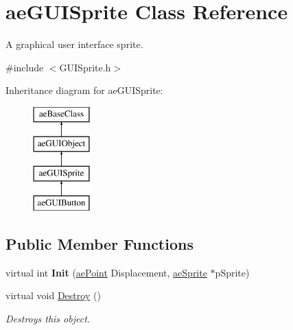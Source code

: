 \hypertarget{classae_g_u_i_sprite}{}\section{ae\+G\+U\+I\+Sprite Class Reference}
\label{classae_g_u_i_sprite}


A graphical user interface sprite.  




{\ttfamily \#include $<$G\+U\+I\+Sprite.\+h$>$}

Inheritance diagram for ae\+G\+U\+I\+Sprite\+:\begin{figure}[H]
\begin{center}
\leavevmode
\includegraphics[height=4.000000cm]{classae_g_u_i_sprite}
\end{center}
\end{figure}
\subsection*{Public Member Functions}
\begin{DoxyCompactItemize}
\item 
virtual int {\bfseries Init} (\hyperlink{structae_core_1_1ae_point}{ae\+Point} Displacement, \hyperlink{classae_core_1_1ae_sprite}{ae\+Sprite} $\ast$p\+Sprite)\hypertarget{classae_g_u_i_sprite_a2c6520841e2da9860d2834ef199b314a}{}\label{classae_g_u_i_sprite_a2c6520841e2da9860d2834ef199b314a}

\item 
virtual void \hyperlink{classae_g_u_i_sprite_a4b4d3427fe8adbc4a575b5313743aa7d}{Destroy} ()\hypertarget{classae_g_u_i_sprite_a4b4d3427fe8adbc4a575b5313743aa7d}{}\label{classae_g_u_i_sprite_a4b4d3427fe8adbc4a575b5313743aa7d}

\begin{DoxyCompactList}\small\item\em Destroys this object. \end{DoxyCompactList}\end{DoxyCompactItemize}
